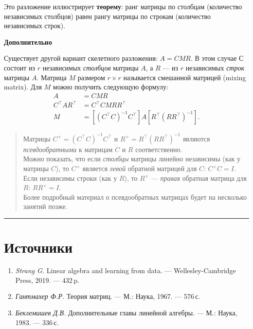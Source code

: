 \documentclass[11pt,a4paper]{article}
\providecommand{\tightlist}{%
      \setlength{\itemsep}{0pt}\setlength{\parskip}{0pt}}
\begin{document}
Это разложение иллюстрирует \textbf{теорему}: ранг матрицы по столбцам
(количество независимых столбцов) равен рангу матрицы по строкам
(количество независимых строк).

    \textbf{Дополнительно}

Существует другой вариант скелетного разложения: \(A = CMR\). В этом
случае \(С\) состоит из \(r\) независимых \emph{столбцов} матрицы \(A\),
а \(R\) --- из \(r\) независимых \emph{строк} матрицы \(A\). Матрица
\(M\) размером \(r \times r\) называется смешанной матрицей (mixing
matrix). Для \(M\) можно получить следующую формулу:
\[
\begin{aligned}
  A               &= CMR \\
  C^\top A R^\top &= C^\top C M R R^\top \\
  M               &= \left[ (C^\top C)^{-1}C^\top \right] A \left[ R^\top (R R^\top)^{-1} \right].
\end{aligned}
\]

    \begin{quote}
Матрицы \(C^+ = (C^\top C)^{-1}C^\top\) и
\(R^+ = R^\top (R R^\top)^{-1}\) являются \emph{псевдообратными} к
матрицам \(C\) и \(R\) соответственно.\\
Можно показать, что если \emph{столбцы} матрицы линейно независимы (как
у матрицы \(C\)), то \(C^+\) является \emph{левой} обратной матрицей для
\(C\): \(C^+ C = I\). Если независимы строки (как у \(R\)), то \(R^+\)
--- \emph{правая} обратная матрица для \(R\): \(R R^+ = I\).\\
Более подробный материал о псевдообратных матрицах будет на несколько
занятий позже.
\end{quote}

    \begin{center}\rule{0.5\linewidth}{0.5pt}\end{center}

    \hypertarget{ux438ux441ux442ux43eux447ux43dux438ux43aux438}{%
\section{Источники}\label{ux438ux441ux442ux43eux447ux43dux438ux43aux438}}

\begin{enumerate}
\def\labelenumi{\arabic{enumi}.}
\tightlist
\item
  \emph{Strang G.} Linear algebra and learning from data. ---
  Wellesley-Cambridge Press, 2019. --- 432\,p.
\item
  \emph{Гантмахер Ф.Р.} Теория матриц. --- М.: Наука, 1967. --- 576\,с.
\item
  \emph{Беклемишев Д.В.} Дополнительные главы линейной алгебры. --- М.:
  Наука, 1983. --- 336\,с.
\end{enumerate}


\end{document}
